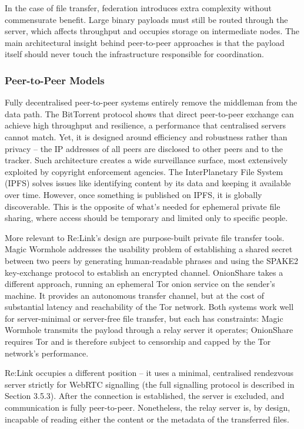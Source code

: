 \documentclass[12pt,a4paper]{article}
\begin{document}
In the case of file transfer, federation introduces extra complexity without commensurate benefit. Large binary payloads must still be routed through the server, which affects throughput and occupies storage on intermediate nodes. The main architectural insight behind peer-to-peer approaches is that the payload itself should never touch the infrastructure responsible for coordination.

\subsubsection{Peer-to-Peer Models}

Fully decentralised peer-to-peer systems entirely remove the middleman from the data path. The BitTorrent protocol \cite{bittorrent} shows that direct peer-to-peer exchange can achieve high throughput and resilience, a performance that centralised servers cannot match. Yet, it is designed around efficiency and robustness rather than privacy – the IP addresses of all peers are disclosed to other peers and to the tracker. Such architecture creates a wide surveillance surface, most extensively exploited by copyright enforcement agencies. The InterPlanetary File System (IPFS) \cite{benet2014} solves issues like identifying content by its data and keeping it available over time. However, once something is published on IPFS, it is globally discoverable. This is the opposite of what’s needed for ephemeral private file sharing, where access should be temporary and limited only to specific people.

More relevant to Re:Link’s design are purpose-built private file transfer tools. Magic Wormhole \cite{magicwormhole} addresses the usability problem of establishing a shared secret between two peers by generating human-readable phrases and using the SPAKE2 \cite{rfc9382} key-exchange protocol to establish an encrypted channel. OnionShare \cite{onionshare} takes a different approach, running an ephemeral Tor onion service on the sender’s machine. It provides an autonomous transfer channel, but at the cost of substantial latency and reachability of the Tor network. Both systems work well for server-minimal or server-free file transfer, but each has constraints: Magic Wormhole transmits the payload through a relay server it operates; OnionShare requires Tor and is therefore subject to censorship and capped by the Tor network’s performance.

Re:Link occupies a different position – it uses a minimal, centralised rendezvous server strictly for WebRTC signalling (the full signalling protocol is described in Section 3.5.3). After the connection is established, the server is excluded, and communication is fully peer-to-peer. Nonetheless, the relay server is, by design, incapable of reading either the content or the metadata of the transferred files.
\end{document}
